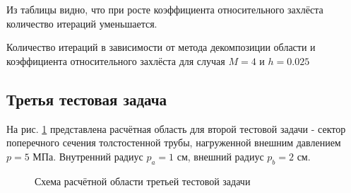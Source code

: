 \documentclass[a4paper]{article}
\begin{document}
Из таблицы видно, что при росте коэффициента относительного захлёста количество итераций уменьшается.

\begin{table}[h]
\caption{Количество итераций в зависимости от метода декомпозиции области и коэффициента относительного захлёста для случая $M = 4$ и $h = 0.025$}
\label{table:task_02_iters_overlap}
\end{table}

\newpage

\subsection{Третья тестовая задача}

На рис. \ref{fig:task_03_scheme} представлена расчётная область для второй тестовой задачи - сектор поперечного сечения толстостенной трубы, нагруженной внешним давлением $p = 5$ МПа. Внутренний радиус $p_a = 1$ см, внешний радиус $p_b = 2 $ см.

\begin{figure}[h]
\caption{Схема расчётной области третьей тестовой задачи}
\label{fig:task_03_scheme}
\end{figure}
\end{document}
